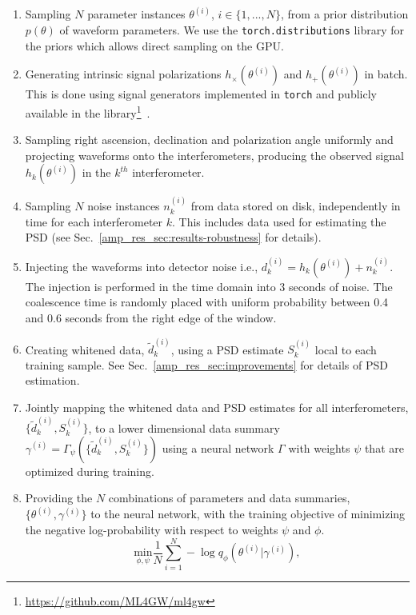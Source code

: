 \begin{refsection}
\begin{enumerate}
    \item Sampling $N$ parameter instances $\theta^{(i)}$, $i \in \{1,...,N\}$, from a prior distribution $p(\theta)$ of waveform parameters. 
    We use the \texttt{torch.distributions} library for the priors which allows direct sampling on the GPU.
    \item Generating intrinsic signal polarizations $h_{\times}(\theta^{(i)})$ and $h_{+}(\theta^{(i)})$ in batch. 
    This is done using signal generators implemented in \texttt{torch} and publicly available in the \mlgw library\footnote{\url{https://github.com/ML4GW/ml4gw}}~\cite{Benoit2025}.
    \item Sampling right ascension, declination and polarization angle uniformly and projecting waveforms onto the interferometers, producing the observed signal $h_k(\theta^{(i)})$ in the $k^{th}$ interferometer. 
    \item Sampling $N$ noise instances $n_k^{(i)}$ from data stored on disk, independently in time for each interferometer $k$. 
    This includes data used for estimating the PSD (see Sec.~\ref{amp_res_sec:results-robustness} for details).
    \item Injecting the waveforms into detector noise i.e., $d_k^{(i)} = h_k(\theta^{(i)}) + n_k^{(i)}$. 
    The injection is performed in the time domain into 3 seconds of noise. 
    The coalescence time is randomly placed with uniform probability between 0.4 and 0.6 seconds from the right edge of the window.
    \item Creating whitened data, $\tilde{d}^{(i)}_k$, using a PSD estimate $S_k^{(i)}$ local to each training sample. 
    See Sec.~\ref{amp_res_sec:improvements} for details of PSD estimation.
    \item Jointly mapping the whitened data and PSD estimates for all interferometers, $\{\tilde{d}^{(i)}_k, S_k^{(i)}\}$, to a lower dimensional data summary $\gamma^{(i)} = \Gamma_\psi(\{\tilde{d}^{(i)}_k, S_k^{(i)}\})$ using a neural network $\Gamma$ with weights $\psi$ that are optimized during training.
    \item Providing the $N$ combinations of parameters and data summaries, $\{\theta^{(i)}, \gamma^{(i)}\}$ to the neural network, with the training objective of minimizing the negative log-probability with respect to weights $\psi$ and $\phi$.
    \begin{equation}
        \underset{\phi,\psi }{\text{min}}  \frac{1}{N}\sum_{i=1}^N -\log q_\phi\left(\theta^{(i)} \vert \gamma^{(i)}\right),
    \end{equation}
\end{enumerate}


\end{refsection}
